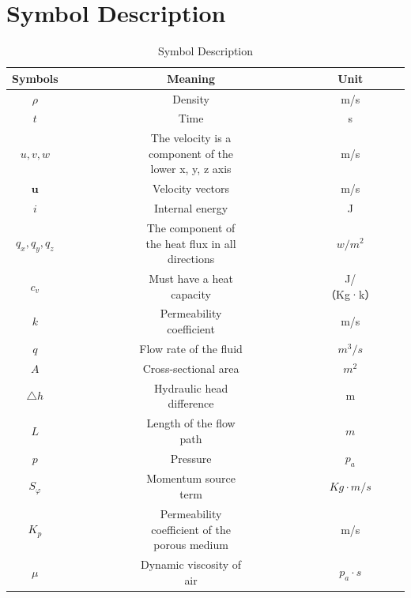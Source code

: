 \documentclass{apmcmthesis}
\begin{document}
\section{Symbol Description}
\begin{table}[htbp]
  \centering
  \label{Symbol Description}
  \caption{Symbol Description}
  \begin{tabular}{ccccccc}
   \toprule
    Symbols & ~~~~~~~~~ & Meaning & ~~~~~~~~~ & Unit \\
   \midrule
   $\rho$ & ~~~~~~~~~ & Density & ~~~~~~~~~ & m/s \\
   $t$   & ~~~~~~~~~ & Time  & ~~~~~~~~~ & s \\
   $u,v,w$   & ~~~~~~~~~ & The velocity is a component of the lower x, y, z axis & ~~~~~~~~~ & m/s \\
   $\textbf{u}$   & ~~~~~~~~~ & Velocity vectors & ~~~~~~~~~ & m/s \\
   $i$    & ~~~~~~~~~ & Internal energy & ~~~~~~~~~ & J \\
   $q_x,q_y,q_z$    & ~~~~~~~~~ & The component of the heat flux in all directions & ~~~~~~~~~  & $w/m^2$ \\
   $c_v$   & ~~~~~~~~~ & Must have a heat capacity  & ~~~~~~~~~ & J/（Kg·k）\\
   $k$   & ~~~~~~~~~  & Permeability coefficient  & ~~~~~~~~~ & m/s \\
   $q$   & ~~~~~~~~~  & Flow rate of the fluid  & ~~~~~~~~~ &  $ m^3/s $\\
   $A$   & ~~~~~~~~~  & Cross-sectional area  & ~~~~~~~~~ & $ m^2 $ \\
   $\bigtriangleup h$    & ~~~~~~~~~ & Hydraulic head difference & ~~~~~~~~~  & m \\
   $L$   & ~~~~~~~~~  & Length of the flow path & ~~~~~~~~~ & $ m $ \\
   $p$   & ~~~~~~~~~  & Pressure & ~~~~~~~~~ &  $p_a$ \\
   $S_\varphi$   & ~~~~~~~~~ & Momentum source term  & ~~~~~~~~~ &  $ Kg\cdot m/s $ \\
   $K_p$   & ~~~~~~~~~& Permeability coefficient of the porous medium & ~~~~~~~~~ &   m/s \\
    $\mu$   & ~~~~~~~~~ & Dynamic viscosity of air & ~~~~~~~~~ &  $ p_a \cdot s $ \\
   
   \bottomrule
\end{tabular}
\end{table}
\end{document}
